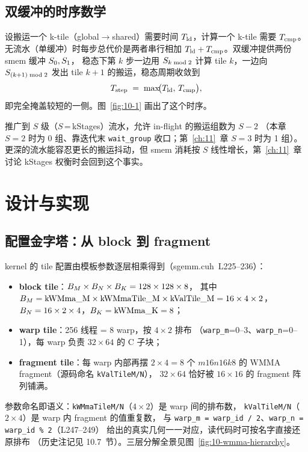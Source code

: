\subsection{双缓冲的时序数学}

设搬运一个 k-tile（global$\to$shared）需要时间 $T\sb {\mathrm{ld}}$，计算一个
k-tile 需要 $T\sb {\mathrm{cmp}}$。无流水（单缓冲）时每步总代价是两者串行相加
$T\sb {\mathrm{ld}} + T\sb {\mathrm{cmp}}$。双缓冲提供两份 smem 缓冲 $S\sb 0, S\sb 1$，
稳态下第 $k$ 步一边用 $S\sb {k\bmod 2}$ 计算 tile $k$，一边向
$S\sb {(k+1)\bmod 2}$ 发出 tile $k+1$ 的搬运，稳态周期收敛到
\begin{equation}
  T\sb {\mathrm{step}} \;=\; \max\!\bigl(T\sb {\mathrm{ld}},\, T\sb {\mathrm{cmp}}\bigr),
  \label{eq:10-pipe}
\end{equation}
即完全掩盖较短的一侧。图~\ref{fig:10-1} 画出了这个时序。

推广到 $S$ 级（$S$\,=\,kStages）流水，允许 in-flight 的搬运组数为 $S-2$
（本章 $S{=}2$ 时为 0 组、靠迭代末 \texttt{wait\_group} 收口；第~\ref{ch:11}~章
$S{=}3$ 时为 1 组）。更深的流水能容忍更长的搬运抖动，但 smem 消耗按 $S$
线性增长，第~\ref{ch:11}~章讨论 kStages 权衡时会回到这个事实。

\section{设计与实现}

\subsection{配置金字塔：从 block 到 fragment}

kernel 的 tile 配置由模板参数逐层相乘得到（sgemm.cuh~L225--236）：
\begin{itemize}
  \item \textbf{block tile}：$B\sb M \times B\sb N \times B\sb K = 128 \times 128 \times 8$，
        其中 $B\sb M = \mathrm{kWMma\_M}\times\mathrm{kWMmaTile\_M}\times\mathrm{kValTile\_M}
        = 16\times4\times2$，$B\sb N = 16\times2\times4$，$B\sb K = \mathrm{kWMma\_K} = 8$；
  \item \textbf{warp tile}：256 线程 = 8 warp，按 $4\times2$ 排布
        （\texttt{warp\_m}=0--3、\texttt{warp\_n}=0--1），每 warp 负责
        $32\times64$ 的 C 子块；
  \item \textbf{fragment tile}：每 warp 内部再摆 $2\times4 = 8$ 个
        $m16n16k8$ 的 WMMA fragment（源码命名 \texttt{kValTileM/N}），
        $32\times64$ 恰好被 $16\times16$ 的 fragment 阵列铺满。
\end{itemize}
参数命名即语义：\texttt{kWMmaTileM/N}（$4\times2$）是 warp 间的排布数，
\texttt{kValTileM/N}（$2\times4$）是 warp 内 fragment 的值重复数，
与 \texttt{warp\_m = warp\_id / 2}、\texttt{warp\_n = warp\_id \% 2}（L247--249）
给出的真实几何一一对应，读代码时可按名字直接还原排布
（历史注记见 10.7~节）。三层分解全景见图~\ref{fig:10-wmma-hierarchy}。

